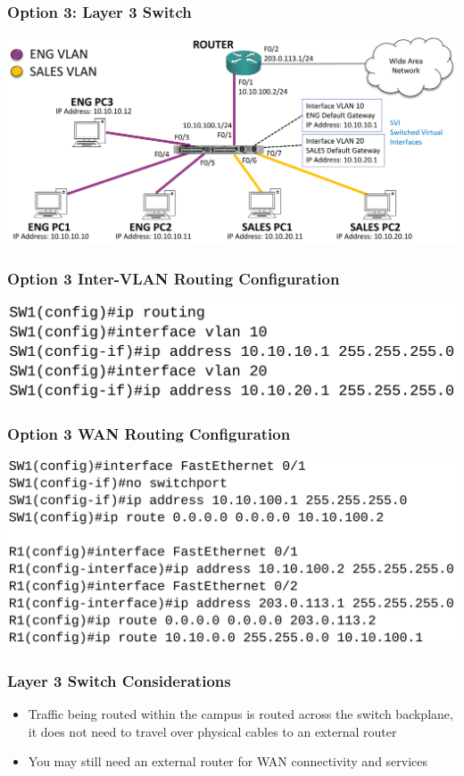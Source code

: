 \documentclass[pdflatex,compress,mathserif]{beamer}
\begin{document}
\begin{frame}
	\frametitle{Option 3: Layer 3 Switch}
	\begin{center}
		\includegraphics[width=\linewidth]{img/img07}
	\end{center}
\end{frame}

\begin{frame}
	\frametitle{Option 3 Inter-VLAN Routing Configuration}
	\begin{center}
		\includegraphics[width=\linewidth]{img/img08}
	\end{center}
\end{frame}

\begin{frame}
	\frametitle{Option 3 WAN Routing Configuration}
	\begin{center}
		\includegraphics[width=\linewidth]{img/img09}
	\end{center}
\end{frame}

\begin{frame}
	\frametitle{Layer 3 Switch Considerations}
	\begin{itemize}
		\item Traffic being routed within the campus is routed across the switch
backplane, it does not need to travel over physical cables to an
external router
		\item You may still need an external router for WAN connectivity and
services
	\end{itemize}
\end{frame}
\end{document}
